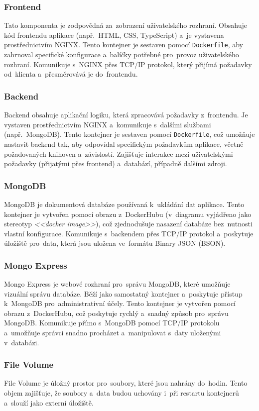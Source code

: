 \documentclass[male,czech,api_bc]{kitheses}
\begin{document}
\subsubsection{Frontend}
Tato komponenta je zodpovědná za~zobrazení uživatelského rozhraní. Obsahuje kód frontendu aplikace (např.~HTML, CSS, TypeScript) a~je vystavena prostřednictvím NGINX. Tento kontejner je sestaven pomocí \texttt{Dockerfile}, aby zahrnoval specifické konfigurace a~balíčky potřebné pro~provoz uživatelského rozhraní. Komunikuje s~NGINX přes TCP/IP protokol, který přijímá požadavky od~klienta a~přesměrovává je do~frontendu.

\subsubsection{Backend}
Backend obsahuje aplikační logiku, která zpracovává požadavky z~frontendu. Je vystaven prostřednictvím NGINX a~komunikuje s~dalšími službami (např.~MongoDB). Tento kontejner je sestaven pomocí \texttt{Dockerfile}, což umožňuje nastavit backend tak, aby odpovídal specifickým požadavkům aplikace, včetně požadovaných knihoven a~závislostí. Zajišťuje interakce mezi uživatelskými požadavky (přijatými přes frontend) a~databází, případně dalšími zdroji.

\subsubsection{MongoDB}
MongoDB je dokumentová databáze používaná k~ukládání dat aplikace. Tento kontejner je vytvořen pomocí obrazu z~DockerHubu (v~diagramu vyjádřeno jako stereotyp \textit{<<docker image>>}), což zjednodušuje nasazení databáze bez~nutnosti vlastní konfigurace. Komunikuje s~backendem přes TCP/IP protokol a~poskytuje úložiště pro~data, která jsou uložena ve~formátu Binary JSON (BSON).

\subsubsection{Mongo Express}
Mongo Express je webové rozhraní pro~správu MongoDB, které umožňuje vizuální správu databáze. Běží jako samostatný kontejner a~poskytuje přístup k~MongoDB pro~administrativní účely. Tento kontejner je vytvořen pomocí obrazu z~DockerHubu, což poskytuje rychlý a~snadný způsob pro~správu MongoDB. Komunikuje přímo s~MongoDB pomocí TCP/IP protokolu a~umožňuje správci snadno procházet a~manipulovat s~daty uloženými v~databázi.

\subsubsection{File Volume}
File Volume je úložný prostor pro~soubory, které jsou nahrány do~hodin. Tento objem zajišťuje, že soubory a~data budou uchovány i~při restartu kontejnerů a~slouží jako externí úložiště.
\end{document}
